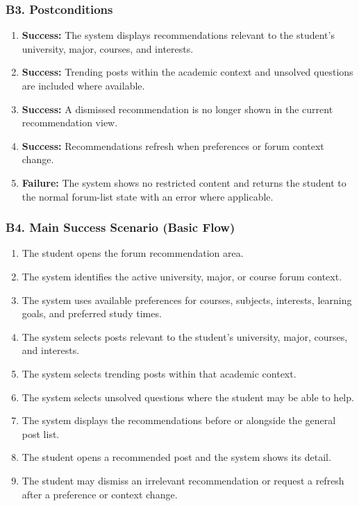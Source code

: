 \documentclass[12pt]{article}
\begin{document}
\hypertarget{sec:b3-postconditions}{}
\subsubsection*{B3. Postconditions}
\par\medskip

\begin{enumerate}
\item \textbf{Success:} The system displays recommendations relevant to the student's university, major, courses, and interests.
\item \textbf{Success:} Trending posts within the academic context and unsolved questions are included where available.
\item \textbf{Success:} A dismissed recommendation is no longer shown in the current recommendation view.
\item \textbf{Success:} Recommendations refresh when preferences or forum context change.
\item \textbf{Failure:} The system shows no restricted content and returns the student to the normal forum-list state with an error where applicable.
\end{enumerate}
\par\medskip

\hypertarget{sec:b4-main-success-scenario-basic-flow}{}
\subsubsection*{B4. Main Success Scenario (Basic Flow)}
\par\medskip

\begin{enumerate}
\item The student opens the forum recommendation area.
\item The system identifies the active university, major, or course forum context.
\item The system uses available preferences for courses, subjects, interests, learning goals, and preferred study times.
\item The system selects posts relevant to the student's university, major, courses, and interests.
\item The system selects trending posts within that academic context.
\item The system selects unsolved questions where the student may be able to help.
\item The system displays the recommendations before or alongside the general post list.
\item The student opens a recommended post and the system shows its detail.
\item The student may dismiss an irrelevant recommendation or request a refresh after a preference or context change.
\end{enumerate}
\par\medskip
\end{document}
